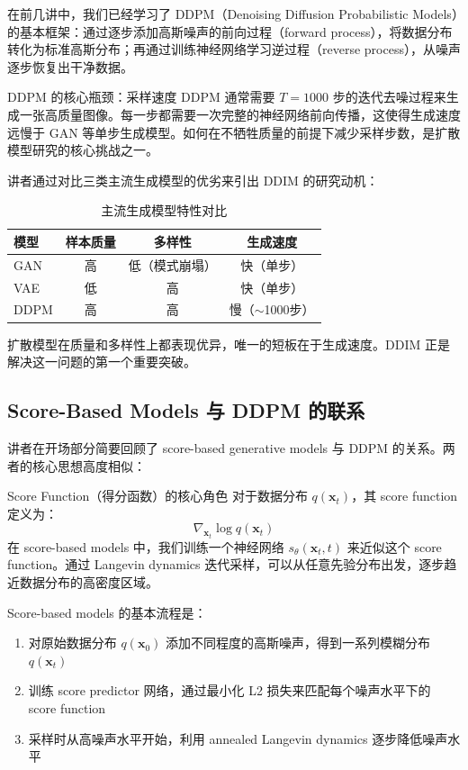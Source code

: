 \documentclass[a4paper]{article}
\begin{document}
在前几讲中，我们已经学习了 DDPM（Denoising Diffusion Probabilistic Models）的基本框架：通过逐步添加高斯噪声的前向过程（forward process），将数据分布转化为标准高斯分布；再通过训练神经网络学习逆过程（reverse process），从噪声逐步恢复出干净数据。

\begin{importantbox}{DDPM 的核心瓶颈：采样速度}
DDPM 通常需要 $T=1000$ 步的迭代去噪过程来生成一张高质量图像。每一步都需要一次完整的神经网络前向传播，这使得生成速度远慢于 GAN 等单步生成模型。如何在不牺牲质量的前提下减少采样步数，是扩散模型研究的核心挑战之一。
\end{importantbox}

讲者通过对比三类主流生成模型的优劣来引出 DDIM 的研究动机：

\begin{table}[H]
\centering
\caption{主流生成模型特性对比}
\begin{tabular}{lccc}
\toprule
\textbf{模型} & \textbf{样本质量} & \textbf{多样性} & \textbf{生成速度} \\
\midrule
GAN & 高 & 低（模式崩塌） & 快（单步） \\
VAE & 低 & 高 & 快（单步） \\
DDPM & 高 & 高 & 慢（$\sim$1000步） \\
\bottomrule
\end{tabular}
\end{table}

扩散模型在质量和多样性上都表现优异，唯一的短板在于生成速度。DDIM 正是解决这一问题的第一个重要突破。

\subsection{Score-Based Models 与 DDPM 的联系}

讲者在开场部分简要回顾了 score-based generative models 与 DDPM 的关系。两者的核心思想高度相似：

\begin{knowledgebox}{Score Function（得分函数）的核心角色}
对于数据分布 $q(\mathbf{x}_t)$，其 score function 定义为：
$$
\nabla_{\mathbf{x}_t} \log q(\mathbf{x}_t)
$$
在 score-based models 中，我们训练一个神经网络 $s_\theta(\mathbf{x}_t, t)$ 来近似这个 score function。通过 Langevin dynamics 迭代采样，可以从任意先验分布出发，逐步趋近数据分布的高密度区域。
\end{knowledgebox}

Score-based models 的基本流程是：
\begin{enumerate}
    \item 对原始数据分布 $q(\mathbf{x}_0)$ 添加不同程度的高斯噪声，得到一系列模糊分布 $q(\mathbf{x}_t)$
    \item 训练 score predictor 网络，通过最小化 L2 损失来匹配每个噪声水平下的 score function
    \item 采样时从高噪声水平开始，利用 annealed Langevin dynamics 逐步降低噪声水平
\end{enumerate}
\end{document}
